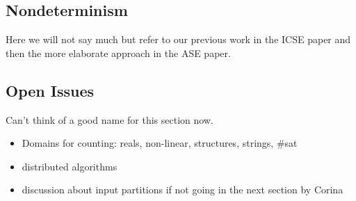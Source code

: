 \subsection{Nondeterminism}

Here we will not say much but refer to our previous work in the ICSE paper and then the more elaborate approach in the ASE paper.

\subsection{Open Issues}

Can't think of a good name for this section now.

\begin{itemize}
\item Domains for counting: reals, non-linear, structures, strings, \#sat
\item distributed algorithms
\item discussion about input partitions if not going in the next section by Corina
\end{itemize}

